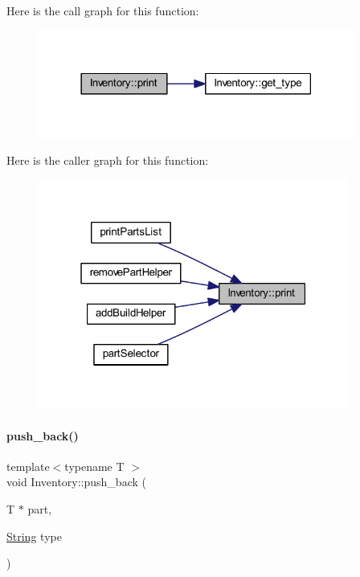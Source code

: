 Here is the call graph for this function\+:
\nopagebreak
\begin{figure}[H]
\begin{center}
\leavevmode
\includegraphics[width=294pt]{class_inventory_ae141405ba9deea67f5c1be1850d136fe_cgraph}
\end{center}
\end{figure}
Here is the caller graph for this function\+:
\nopagebreak
\begin{figure}[H]
\begin{center}
\leavevmode
\includegraphics[width=289pt]{class_inventory_ae141405ba9deea67f5c1be1850d136fe_icgraph}
\end{center}
\end{figure}
\mbox{\label{class_inventory_a86dd14362d6cefb46d4e40667c44481c}} 
\paragraph{\texorpdfstring{push\_back()}{push\_back()}}
{\footnotesize\ttfamily template$<$typename T $>$ \\
void Inventory\+::push\+\_\+back (\begin{DoxyParamCaption}\item[{T $\ast$}]{part,  }\item[{\mbox{\hyperlink{class_string}{String}}}]{type }\end{DoxyParamCaption})}



